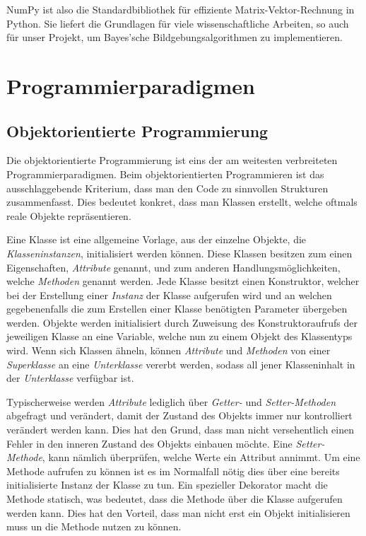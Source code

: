 \documentclass[]{dsadokumentation}
\begin{document}
NumPy ist also die Standardbibliothek für effiziente Matrix-Vektor-Rechnung in Python. Sie liefert die Grundlagen für viele wissenschaftliche Arbeiten, so auch für unser Projekt, um Bayes'sche Bildgebungsalgorithmen zu implementieren.


\section{Programmierparadigmen}
\subsection{Objektorientierte Programmierung}
Die objektorientierte Programmierung ist eins der am weitesten verbreiteten Programmierparadigmen. Beim objektorientierten Programmieren ist das ausschlaggebende Kriterium, dass man den Code zu sinnvollen Strukturen zusammenfasst. Dies bedeutet konkret, dass man Klassen erstellt, welche oftmals reale Objekte repräsentieren.

Eine Klasse ist eine allgemeine Vorlage, aus der einzelne Objekte, die \emph{Klasseninstanzen}, initialisiert werden können. Diese Klassen besitzen zum einen Eigenschaften, \emph{Attribute} genannt, und zum anderen Handlungsmöglichkeiten, welche \emph{Methoden} genannt werden. Jede Klasse besitzt einen Konstruktor, welcher bei der Erstellung einer \emph{Instanz} der Klasse aufgerufen wird und an welchen gegebenenfalls die zum Erstellen einer Klasse benötigten Parameter übergeben werden. Objekte werden initialisiert durch Zuweisung des Konstruktoraufrufs der jeweiligen Klasse an eine Variable, welche nun zu einem Objekt des Klassentyps wird. Wenn sich Klassen ähneln, können \emph{Attribute} und \emph{Methoden} von einer \emph{Superklasse} an eine \emph{Unterklasse} vererbt werden, sodass all jener Klasseninhalt in der \emph{Unterklasse} verfügbar ist.

Typischerweise werden \emph{Attribute} lediglich über \emph{Getter-} und \emph{Setter-Methoden} abgefragt und verändert, damit der Zustand des Objekts immer nur kontrolliert verändert werden kann. Dies hat den Grund, dass man nicht versehentlich einen Fehler in den inneren Zustand des Objekts einbauen möchte. Eine \emph{Setter-Methode}, kann nämlich überprüfen, welche Werte ein Attribut annimmt. Um eine Methode aufrufen zu können ist es im Normalfall nötig dies über eine bereits initialisierte Instanz der Klasse zu tun. Ein spezieller Dekorator macht die Methode statisch, was bedeutet, dass die Methode über die Klasse aufgerufen werden kann. Dies hat den Vorteil, dass man nicht erst ein Objekt initialisieren muss un die Methode nutzen zu können.
\end{document}
